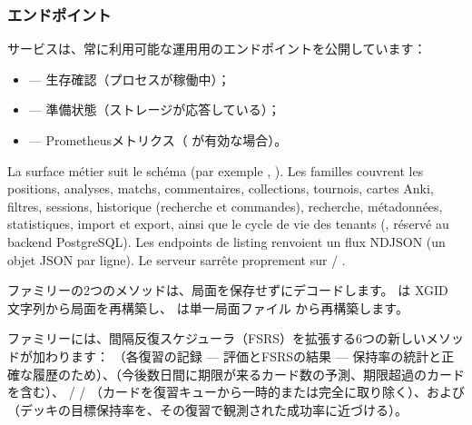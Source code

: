 \documentclass[letterpaper,10pt,dvipdfmx]{sphinxmanual}
\begin{document}
\subsubsection{エンドポイント}
\label{\detokenize{mode_headless:points-d-acces}}
\sphinxAtStartPar
サービスは、常に利用可能な運用用のエンドポイントを公開しています：
\begin{itemize}
\item {} 
\sphinxAtStartPar
{} — 生存確認（プロセスが稼働中）；

\item {} 
\sphinxAtStartPar
{} — 準備状態（ストレージが応答している）；

\item {} 
\sphinxAtStartPar
{} — Prometheusメトリクス（ が有効な場合）。

\end{itemize}

\sphinxAtStartPar
La surface métier suit le schéma  (par exemple
, ). Les familles couvrent les
positions, analyses, matchs, commentaires, collections, tournois, cartes Anki,
filtres, sessions, historique (recherche et commandes), recherche,
métadonnées, statistiques, import et export, ainsi que le cycle de vie des
tenants (, réservé au backend PostgreSQL). Les endpoints de
listing renvoient un flux NDJSON (un objet JSON par ligne). Le serveur
s\textquotesingle{}arrête proprement sur  / .

\sphinxAtStartPar
{} ファミリーの2つのメソッドは、局面を保存せずにデコードします。 は XGID 文字列から局面を再構築し、 は単一局面ファイル  から再構築します。

\sphinxAtStartPar
{} ファミリーには、間隔反復スケジューラ（FSRS）を拡張する6つの新しいメソッドが加わります： （各復習の記録 — 評価とFSRSの結果 — 保持率の統計と正確な履歴のため）、（今後数日間に期限が来るカード数の予測、期限超過のカードを含む）、 /  / （カードを復習キューから一時的または完全に取り除く）、および （デッキの目標保持率を、その復習で観測された成功率に近づける）。
\end{document}
